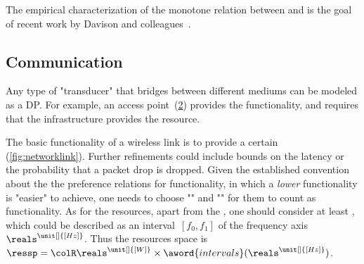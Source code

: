 \begin{figure}[h]
    \centering
    \caption{\label{fig:progressive}}
\end{figure}


\begin{example}
    The empirical characterization of the monotone relation between  and 
    is the goal of recent work by Davison and colleagues~\cite{nardi15introducing,zia16comparative}.
\end{example}


\subsection{Communication}

\begin{example}[Transducers]
    Any type of "transducer" that bridges between different
    mediums can be modeled as a DP. For example, an access point~(\cref{fig:accesspoint})
    provides the  functionality, and requires
    that the infrastructure provides the  resource.
\end{example}


\begin{figure}[h]
    \centering
    \caption{\label{fig:accesspoint}}
\end{figure}

\begin{example}
    The basic functionality of a wireless link is to provide
    a certain  (\cref{fig:networklink}). Further refinements could include bounds
    on the latency or the probability that a packet drop is dropped. Given
    the established convention about the the preference relations for
    functionality, in which a \emph{lower} functionality is "easier"
    to achieve, one needs to choose ""
    and "" for them
    to count as functionality. As for the resources, apart from the , one should consider at least ,
    which could be described as an interval~$[f_0,f_1]$ of the frequency
    axis $\reals^{\unit[]{[Hz]}}$. Thus the resources space is $\ressp=\colR\reals^{\unit[]{[W]}}\times\aword{intervals}(\reals^{\unit[]{[Hz]}})$.
\end{example}

